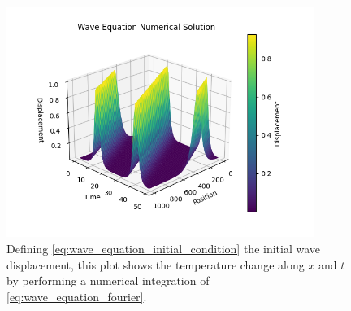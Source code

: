 \begin{figure}[H]
    \centering
    \includegraphics[width=100mm,height=\textheight,keepaspectratio]{images/wave_equation_numerical.png}
    \caption{Defining \cref{eq:wave_equation_initial_condition} the initial wave displacement, this plot shows the temperature change along \(x\) and \(t\) by performing a numerical integration of \cref{eq:wave_equation_fourier}.}
    \label{fig:wave_equation_numerical}
\end{figure}